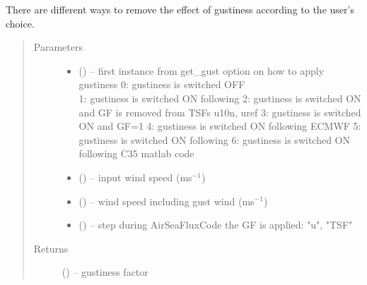 \documentclass[letterpaper,10pt,english]{sphinxmanual}
\begin{document}

\begin{fulllineitems}
\label{\detokenize{index:flux_subs.apply_GF}}
There are different ways to remove the effect of gustiness according to the user's choice.
\begin{quote}\begin{description}
\item[{Parameters}] \leavevmode\begin{itemize}
\item {} 
 (\href{https://docs.python.org/3/library/functions.html\#float}{}) -- first instance from get\_gust
        option on how to apply gustiness
        0: gustiness is switched OFF \\
        1: gustiness is switched ON following \cite{Fairall_etal_2003}
        2: gustiness is switched ON and GF is removed from TSFs u10n, uref
        3: gustiness is switched ON and GF=1
        4: gustiness is switched ON following ECMWF
        5: gustiness is switched ON following \cite{Zeng_etal_1998} 
        6: gustiness is switched ON following C35 matlab code

\item {} 
 (\href{https://docs.python.org/3/library/functions.html\#float}{}) -- input wind speed (ms$^{-1}$)

\item {} 
 (\href{https://docs.python.org/3/library/functions.html\#float}{}) -- wind speed including gust wind (ms$^{-1}$)

\item {} 
 (\href{https://docs.python.org/3/library/functions.html\#str}{}) -- step during AirSeaFluxCode the GF is applied: "u", "TSF"

\end{itemize}

\item[{Returns}] \leavevmode
{} (\href{https://docs.python.org/3/library/functions.html\#float}{}) -- gustiness factor

\end{description}\end{quote}

\end{fulllineitems}
\end{document}

